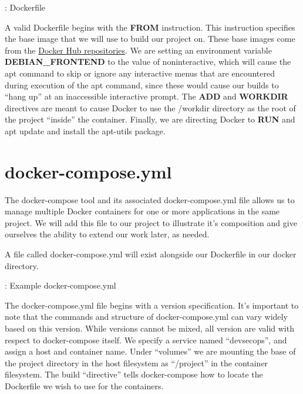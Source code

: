 \justifying
\begin{mybox}{\thetcbcounter: Dockerfile}
  
  \label{mydockerfile}
\end{mybox}

\justifying
A valid Dockerfile begins with the \textbf{FROM} instruction. This instruction specifies the base image that we
will use to build our project on. These base images come from the
\href{https://docs.docker.com/docker-hub/repos/}{Docker Hub repositories}. We are setting an environment variable
\textbf{DEBIAN\_FRONTEND} to the value of noninteractive, which will cause the apt command to skip or ignore any
interactive menus that are encountered during execution of the apt command, since these would cause
our builds to ``hang up'' at an inaccessible interactive prompt. The \textbf{ADD} and \textbf{WORKDIR} directives
are meant to cause Docker to use the /workdir directory as the root of the project ``inside'' the
container. Finally, we are directing Docker to \textbf{RUN} and apt update and install the apt-utils package.

\section{docker-compose.yml}
\justifying
The docker-compose tool and its associated docker-compose.yml file allows us to manage multiple Docker containers for
one or more applications in the same project. We will add this file to our project to illustrate it's
composition and give ourselves the ability to extend our work later, as needed.

\justifying
A file called docker-compose.yml will exist
alongside our Dockerfile in our docker directory.

\begin{mybox}{\thetcbcounter: Example docker-compose.yml}
  
\end{mybox}

\justifying
The docker-compose.yml file begins with a version specification. It's important to note that the commands and structure
of docker-compose.yml can vary widely based on this version. While versions cannot be mixed, all version are valid with
respect to docker-compose itself. We specify a service named ``devsecops'', and assign a host and container name. Under
``volumes'' we are mounting the base of the project directory in the host
filesystem as ``/project'' in the container filesystem. The build
``directive'' tells docker-compose how to locate the Dockerfile we wish to use for the containers.

